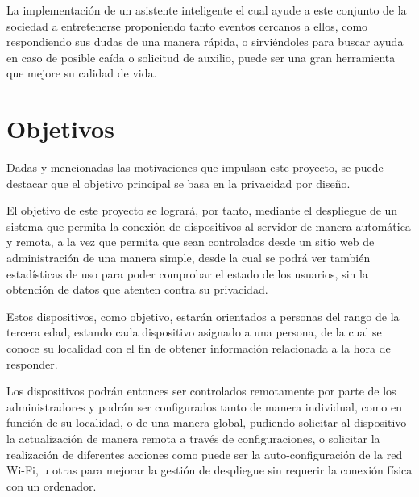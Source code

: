 La implementación de un asistente inteligente el cual ayude a este conjunto de la sociedad a entretenerse proponiendo tanto eventos cercanos a ellos, como respondiendo sus dudas de una manera rápida, o sirviéndoles para buscar ayuda en caso de posible caída o solicitud de auxilio, puede ser una gran herramienta que mejore su calidad de vida.


\section{Objetivos}

Dadas y mencionadas las motivaciones que impulsan este proyecto, se puede destacar que el objetivo principal se basa en la privacidad por diseño.

El objetivo de este proyecto se logrará, por tanto, mediante el despliegue de un sistema que permita la conexión de dispositivos al servidor de manera automática y remota, a la vez que permita que sean controlados desde un sitio web de administración de una manera simple, desde la cual se podrá ver también estadísticas de uso para poder comprobar el estado de los usuarios, sin la obtención de datos que atenten contra su privacidad.

Estos dispositivos, como objetivo, estarán orientados a personas del rango de la tercera edad, estando cada dispositivo asignado a una persona, de la cual se conoce su localidad con el fin de obtener información relacionada a la hora de responder.

Los dispositivos podrán entonces ser controlados remotamente por parte de los administradores y podrán ser configurados tanto de manera individual, como en función de su localidad, o de una manera global, pudiendo solicitar al dispositivo la actualización de manera remota a través de configuraciones, o solicitar la realización de diferentes acciones como puede ser la auto-configuración de la red Wi-Fi, u otras para mejorar la gestión de despliegue sin requerir la conexión física con un ordenador.


